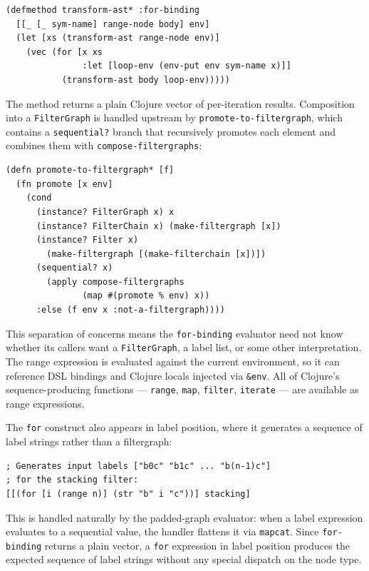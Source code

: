 \documentclass[conference]{IEEEtran}
\begin{document}
\begin{lstlisting}[caption={for-binding evaluation}]
(defmethod transform-ast* :for-binding
  [[_ [_ sym-name] range-node body] env]
  (let [xs (transform-ast range-node env)]
    (vec (for [x xs
               :let [loop-env (env-put env sym-name x)]]
           (transform-ast body loop-env)))))
\end{lstlisting}

The method returns a plain Clojure vector of per-iteration results. Composition into a \texttt{FilterGraph} is handled upstream by \texttt{promote-to-filtergraph}, which contains a \texttt{sequential?} branch that recursively promotes each element and combines them with \texttt{compose-filtergraphs}:

\begin{lstlisting}[caption={promote-to-filtergraph* with sequential? branch}]
(defn promote-to-filtergraph* [f]
  (fn promote [x env]
    (cond
      (instance? FilterGraph x) x
      (instance? FilterChain x) (make-filtergraph [x])
      (instance? Filter x)
        (make-filtergraph [(make-filterchain [x])])
      (sequential? x)
        (apply compose-filtergraphs
               (map #(promote % env) x))
      :else (f env x :not-a-filtergraph))))
\end{lstlisting}

This separation of concerns means the \texttt{for-binding} evaluator need not know whether its callers want a \texttt{FilterGraph}, a label list, or some other interpretation. The range expression is evaluated against the current environment, so it can reference DSL bindings and Clojure locals injected via \texttt{\&env}. All of Clojure's sequence-producing functions --- \texttt{range}, \texttt{map}, \texttt{filter}, \texttt{iterate} --- are available as range expressions.

The \texttt{for} construct also appears in label position, where it generates a sequence of label strings rather than a filtergraph:

\begin{lstlisting}[caption={for in label position}]
; Generates input labels ["b0c" "b1c" ... "b(n-1)c"]
; for the stacking filter:
[[(for [i (range n)] (str "b" i "c"))] stacking]
\end{lstlisting}

This is handled naturally by the padded-graph evaluator: when a label expression evaluates to a sequential value, the handler flattens it via \texttt{mapcat}. Since \texttt{for-binding} returns a plain vector, a \texttt{for} expression in label position produces the expected sequence of label strings without any special dispatch on the node type.
\end{document}
